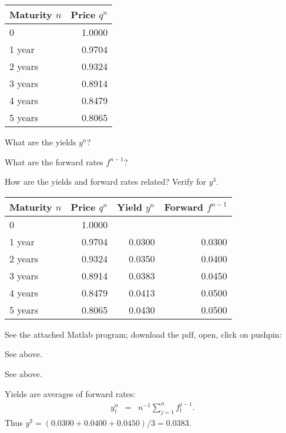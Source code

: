 \documentclass[11pt]{exam}
\begin{document}
\begin{questions}
\medskip
\begin{center}
\tabcolsep=0.1in
\begin{tabular}{lr}
\toprule
Maturity $n$   & \phantom{xx} Price $q^n$ \\ %
\midrule
0           &    1.0000   \\
1 year      &    0.9704   \\
2 years     &    0.9324   \\
3 years     &    0.8914   \\
4 years     &    0.8479   \\
5 years     &    0.8065   \\
\bottomrule
\end{tabular}
\end{center}
\medskip

\begin{parts}
\item What are the yields $y^n$?
\item What are the forward rates $f^{n-1}$?
\item How are the yields and forward rates related?  Verify for $y^3$.
\end{parts}

\begin{solution}
\begin{center}
\tabcolsep=0.1in
\begin{tabular}{lrrr}
\toprule
Maturity $n$   & \phantom{xx} Price $q^n$ & \phantom{xx} Yield $y^n$ & Forward $f^{n-1}$ \\
\midrule
0           &    1.0000  \\
1 year      &    0.9704  & 0.0300 & 0.0300 \\
2 years     &    0.9324  & 0.0350 & 0.0400 \\
3 years     &    0.8914  & 0.0383 & 0.0450 \\
4 years     &    0.8479  & 0.0413 & 0.0500 \\
5 years     &    0.8065  & 0.0430 & 0.0500 \\
\bottomrule
\end{tabular}
\end{center}
See the attached Matlab program;
download the pdf, open, click on pushpin:

\begin{parts}
\item See above.
\item See above.
\item Yields are averages of forward rates:
\begin{eqnarray*}
    y^n_t &=& n^{-1} \sum_{j=1}^n f^{j-1}_t .
\end{eqnarray*}
Thus $y^3 = (0.0300 + 0.0400 +  0.0450)/3 = 0.0383$.
\end{parts}
\end{solution}


\end{questions}
\end{document}
